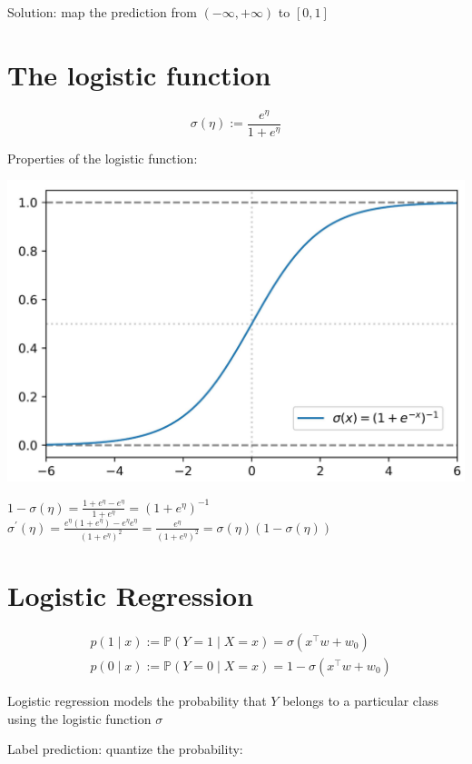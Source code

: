 \documentclass[10pt]{article}
\begin{document}
Solution: map the prediction from $(-\infty,+\infty)$ to $[0,1]$

\section*{The logistic function}
$$
\sigma(\eta):=\frac{e^{\eta}}{1+e^{\eta}}
$$

Properties of the logistic function:

\begin{center}
\includegraphics[max width=\textwidth]{2023_12_30_261a5c67f471a6c49904g-04}
\end{center}

$1-\sigma(\eta)=\frac{1+e^{\eta}-e^{\eta}}{1+e^{\eta}}=\left(1+e^{\eta}\right)^{-1}$
$\sigma^{\prime}(\eta)=\frac{e^{\eta}\left(1+e^{\eta}\right)-e^{\eta} e^{\eta}}{\left(1+e^{\eta}\right)^{2}}=\frac{e^{\eta}}{\left(1+e^{\eta}\right)^{2}}=\sigma(\eta)(1-\sigma(\eta))$

\section*{Logistic Regression}
$$
\begin{aligned}
& p(1 \mid x):=\mathbb{P}(Y=1 \mid X=x)=\sigma\left(x^{\top} w+w_{0}\right) \\
& p(0 \mid x):=\mathbb{P}(Y=0 \mid X=x)=1-\sigma\left(x^{\top} w+w_{0}\right)
\end{aligned}
$$

Logistic regression models the probability that $Y$ belongs to a particular class using the logistic function $\sigma$

Label prediction: quantize the probability:
\end{document}
